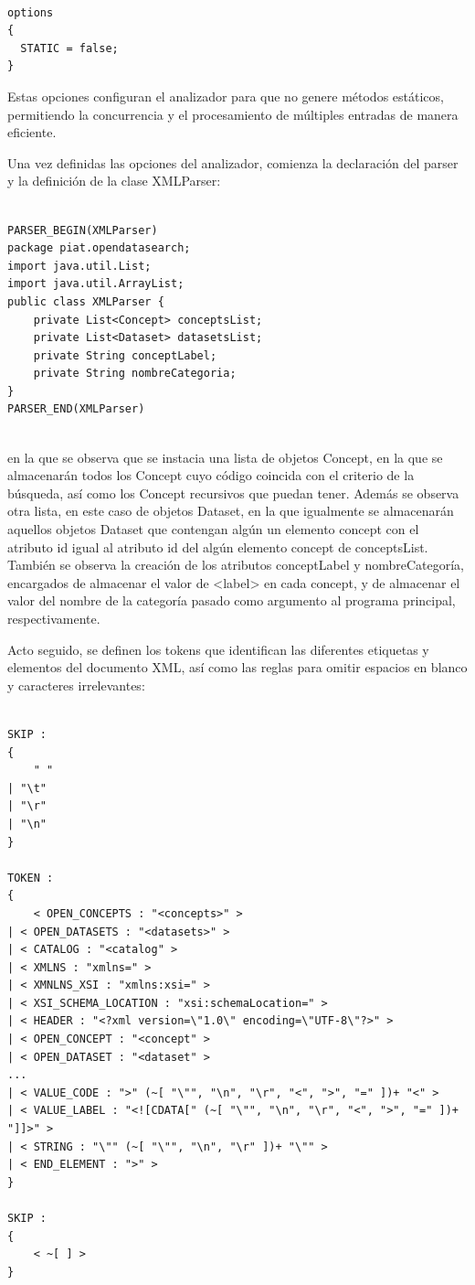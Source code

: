 \lstset{inputencoding=utf8/latin1}
\begin{lstlisting}

options
{
  STATIC = false;
}

\end{lstlisting}

Estas opciones configuran el analizador para que no genere métodos estáticos, permitiendo la concurrencia y el procesamiento de múltiples entradas de manera eficiente.

Una vez definidas las opciones del analizador, comienza la declaración del parser y la definición de la clase XMLParser:

\lstset{inputencoding=utf8/latin1}
\begin{lstlisting}
    
PARSER_BEGIN(XMLParser)
package piat.opendatasearch;
import java.util.List;
import java.util.ArrayList;
public class XMLParser {
    private List<Concept> conceptsList;
    private List<Dataset> datasetsList;
    private String conceptLabel;
    private String nombreCategoria;
}
PARSER_END(XMLParser)
    
\end{lstlisting}

en la que se observa que se instacia una lista de objetos Concept, en la que se almacenarán todos los Concept cuyo código coincida con el criterio de la búsqueda, así como los Concept recursivos que puedan tener.
Además se observa otra lista, en este caso de objetos Dataset, en la que igualmente se almacenarán aquellos objetos Dataset que contengan algún un elemento concept con el atributo id igual al atributo id del algún elemento concept de conceptsList.
También se observa la creación de los atributos conceptLabel y nombreCategoría, encargados de almacenar el valor de <label> en cada concept, y de almacenar el valor del nombre de la categoría pasado como argumento al programa principal, respectivamente.

Acto seguido, se definen los tokens que identifican las diferentes etiquetas y elementos del documento XML, así como las reglas para omitir espacios en blanco y caracteres irrelevantes:

\lstset{inputencoding=utf8/latin1}
\begin{lstlisting}
    
SKIP :
{
    " "
| "\t"
| "\r"
| "\n"
}

TOKEN :
{
    < OPEN_CONCEPTS : "<concepts>" >
| < OPEN_DATASETS : "<datasets>" >
| < CATALOG : "<catalog" >
| < XMLNS : "xmlns=" >
| < XMNLNS_XSI : "xmlns:xsi=" >
| < XSI_SCHEMA_LOCATION : "xsi:schemaLocation=" >
| < HEADER : "<?xml version=\"1.0\" encoding=\"UTF-8\"?>" >
| < OPEN_CONCEPT : "<concept" >
| < OPEN_DATASET : "<dataset" >
...
| < VALUE_CODE : ">" (~[ "\"", "\n", "\r", "<", ">", "=" ])+ "<" >
| < VALUE_LABEL : "<![CDATA[" (~[ "\"", "\n", "\r", "<", ">", "=" ])+ "]]>" >
| < STRING : "\"" (~[ "\"", "\n", "\r" ])+ "\"" >
| < END_ELEMENT : ">" >
}

SKIP :
{
    < ~[ ] >
}
    
\end{lstlisting}

